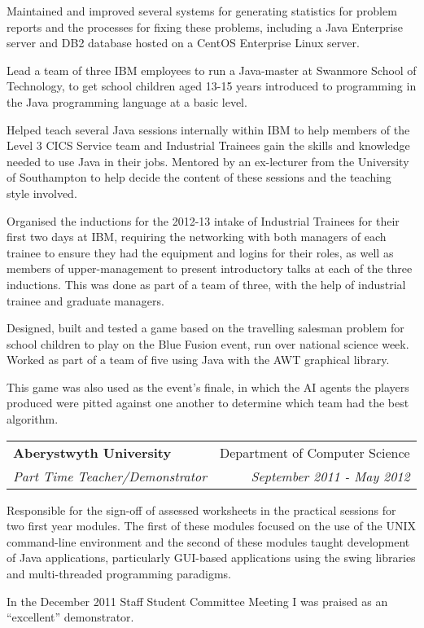 \documentclass[letterpaper,11pt]{article}
\makeatletter
\newcommand{\ressubheading}[4]{
\vspace{10pt}
\begin{tabular*}{6.5in}{l@{\cftdotfill{\cftsecdotsep}\extracolsep{\fill}}r}
		\textbf{#1} & #2 \\
		\textit{#3} & \textit{#4} \\
\end{tabular*}\vspace{-6pt}
\vspace{10pt}}
\makeatother
\begin{document}
Maintained and improved several systems for generating statistics for problem 
reports and the processes for fixing these problems, including a Java 
Enterprise server and DB2 database hosted on a CentOS Enterprise Linux server.

Lead a team of three IBM employees to run a Java-master at Swanmore School of 
Technology, to get school children aged 13-15 years introduced to programming 
in the Java programming language at a basic level.

Helped teach several Java sessions internally within IBM to help members of the
Level 3 CICS Service team and Industrial Trainees gain the skills and knowledge
needed to use Java in their jobs. Mentored by an ex-lecturer from the 
University of Southampton to help decide the content of these sessions and the 
teaching style involved.

Organised the inductions for the 2012-13 intake of Industrial Trainees for 
their first two days at IBM, requiring the networking with both managers of 
each trainee to ensure they had the equipment and logins for their roles, as 
well as members of upper-management to present introductory talks at each of 
the three inductions. This was done as part of a team of three, with the help 
of industrial trainee and graduate managers.

Designed, built and tested a game based on the travelling salesman problem for
school children to play on the Blue Fusion event, run over national science 
week. Worked as part of a team of five using Java with the AWT graphical 
library.

This game was also used as the event's finale, in which the AI agents the 
players produced were pitted against one another to determine which team had the
best algorithm.


\ressubheading{Aberystwyth University}{Department of Computer Science}{Part 
Time Teacher/Demonstrator}{September 2011 - May 2012}

Responsible for the sign-off of assessed worksheets in the practical sessions 
for two first year modules. The first of these modules 
focused on the use of the UNIX command-line environment and the second of these
modules taught development of Java applications, particularly GUI-based 
applications using the swing libraries and multi-threaded programming 
paradigms.

In the December 2011 Staff Student Committee Meeting I was praised as an 
``excellent'' demonstrator.
\end{document}
